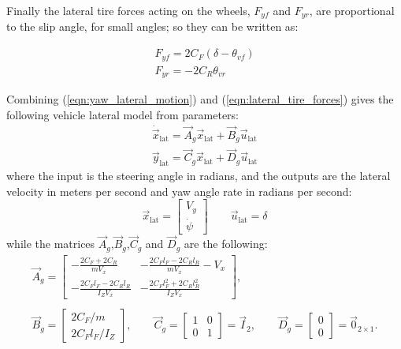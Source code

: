 Finally the lateral tire forces acting on the wheels, $F_{yf}$ and $F_{yr}$, are proportional to the slip angle, for small angles; so they can be written as:

\begin{equation}
	\label{eqn:lateral_tire_forces}
	\begin{array}{ll}
	F_{yf} = 2C_F(\delta-\theta_{vf})\\
	F_{yr} = -2C_R\theta_{vr}
	\end{array}
\end{equation} 

Combining (\ref{eqn:yaw_lateral_motion}) and (\ref{eqn:lateral_tire_forces}) gives the following vehicle lateral model from parameters: 
\begin{equation}
\label{eqn:lateral_dynamics_simple_model}
\begin{array}{ll}
\dot{\vec{x}}_{\text{lat}} =\vec{A}_g \vec{x}_{\text{lat}}+ \vec{B}_g \vec{u}_{\text{lat}}\\
\vec{y}_{\text{lat}} =\vec{C}_g \vec{x}_{\text{lat}} + \vec{D}_g \vec{u}_{\text{lat}}
\end{array}
\end{equation}
where the input is the steering angle in radians, and the outputs are the lateral velocity in meters per second and yaw angle rate in radians per second:
\begin{equation}
\vec{x}_{\text{lat}} = \begin{bmatrix}
V_y\\\dot{\psi}
\end{bmatrix}
\qquad
\vec{u}_{\text{lat}} = \delta
\end{equation}
while the matrices $\vec{A}_g$,$\vec{B}_g$,$\vec{C}_g$ and $\vec{D}_g$ are the following:
\begin{equation}
\begin{array}{cc}
\vec{A}_g=
\begin{bmatrix}
\displaystyle -\frac{2C_F+2C_R}{mV_x}&\displaystyle -\frac{2C_Fl_F-2C_Rl_R}{mV_x} - V_x\\
\displaystyle -\frac{2C_Fl_F-2C_Rl_R}{I_ZV_x}&\displaystyle -\frac{2C_Fl_F^2+2C_Rl_R^2}{I_ZV_x}
\end{bmatrix},
\\\\
\vec{B}_g=\begin{bmatrix}
2C_F/m\\2C_Fl_F/I_Z
\end{bmatrix},
\qquad
\vec{C}_g=\begin{bmatrix}
1&0\\0&1
\end{bmatrix}=
\vec{I}_2, 
\qquad
\vec{D}_g=\begin{bmatrix}
0\\0
\end{bmatrix}=
\vec{0}_{2\times1}.
\end{array}
\end{equation}
